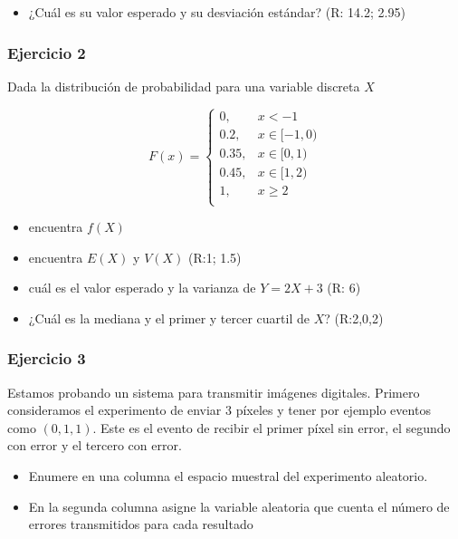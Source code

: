\documentclass[
]{book}
\providecommand{\tightlist}{%
  \setlength{\itemsep}{0pt}\setlength{\parskip}{0pt}}
\begin{document}
\begin{itemize}
\tightlist
\item
  ¿Cuál es su valor esperado y su desviación estándar? (R: 14.2; 2.95)
\end{itemize}

\hypertarget{ejercicio-2-3}{%
\subsubsection{Ejercicio 2}\label{ejercicio-2-3}}

Dada la distribución de probabilidad para una variable discreta \(X\)

\[
    F(x)=
\begin{cases}
0, & x < -1 \\
0.2,& x \in [-1,0)\\
0.35,& x \in [0,1)\\
0.45,& x \in [1,2)\\
1,& x \geq 2\\
\end{cases}
\]

\begin{itemize}
\tightlist
\item
  encuentra \(f(X)\)
\item
  encuentra \(E(X)\) y \(V(X)\) (R:1; 1.5)
\item
  cuál es el valor esperado y la varianza de \(Y=2X+3\) (R: 6)
\item
  ¿Cuál es la mediana y el primer y tercer cuartil de \(X\)? (R:2,0,2)
\end{itemize}

\hypertarget{ejercicio-3-1}{%
\subsubsection{Ejercicio 3}\label{ejercicio-3-1}}

Estamos probando un sistema para transmitir imágenes digitales. Primero consideramos el experimento de enviar \(3\) píxeles y tener por ejemplo eventos como \((0,1,1)\). Este es el evento de recibir el primer píxel sin error, el segundo con error y el tercero con error.

\begin{itemize}
\item
  Enumere en una columna el espacio muestral del experimento aleatorio.
\item
  En la segunda columna asigne la variable aleatoria que cuenta el número de errores transmitidos para cada resultado
\end{itemize}
\end{document}
